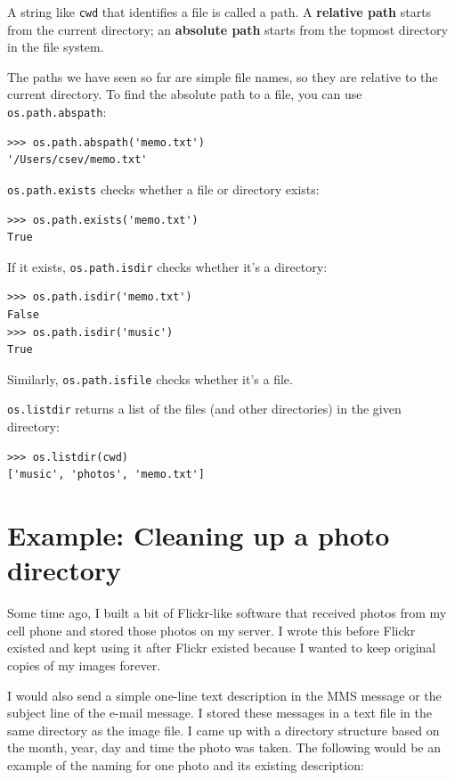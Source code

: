 \documentclass[11pt]{book}
\begin{document}

A string like {\tt cwd} that identifies a file is called a path.
A {\bf relative path} starts from the current directory;
an {\bf absolute path} starts from the topmost directory in the
file system.


The paths we have seen so far are simple file names, so they are
relative to the current directory.  To find the absolute path to
a file, you can use {\tt os.path.abspath}:

\beforeverb
\begin{verbatim}
>>> os.path.abspath('memo.txt')
'/Users/csev/memo.txt'
\end{verbatim}
\afterverb
%
{\tt os.path.exists} checks
whether a file or directory exists:


\beforeverb
\begin{verbatim}
>>> os.path.exists('memo.txt')
True
\end{verbatim}
\afterverb
%
If it exists, {\tt os.path.isdir} checks whether it's a directory:

\beforeverb
\begin{verbatim}
>>> os.path.isdir('memo.txt')
False
>>> os.path.isdir('music')
True
\end{verbatim}
\afterverb
%
Similarly, {\tt os.path.isfile} checks whether it's a file.

{\tt os.listdir} returns a list of the files (and other directories)
in the given directory:

\beforeverb
\begin{verbatim}
>>> os.listdir(cwd)
['music', 'photos', 'memo.txt']
\end{verbatim}
\afterverb
%


\section{Example: Cleaning up a photo directory}

Some time ago, I built a bit of Flickr-like software that 
received photos from my cell phone and stored those photos
on my server.  I wrote this before Flickr existed and kept 
using it after Flickr existed because
I wanted to keep original copies of my images forever.

I would also send a simple one-line text description in the MMS message
or the subject line of the e-mail message.  I stored these messages
in a text file in the same directory as the image file.   I came up 
with a directory structure based on the month, year, day and time the 
photo was taken.   The following would be an example of the naming for 
one photo and its existing description:
\end{document}
